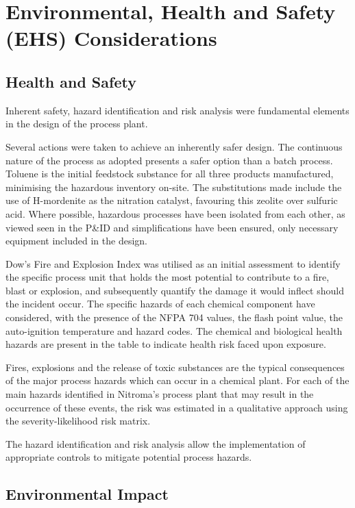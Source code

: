 \section{Environmental, Health and Safety (EHS) Considerations}
\label{sec:ehs}
\subsection{Health and Safety}

Inherent safety, hazard identification and risk analysis were fundamental elements in the design of the process plant. 

Several actions were taken to achieve an inherently safer design. The continuous nature of the process as adopted presents a safer option than a batch process. Toluene is the initial feedstock substance for all three products manufactured, minimising the hazardous inventory on-site. The substitutions made include the use of H-mordenite as the nitration catalyst, favouring this zeolite over sulfuric acid. Where possible, hazardous processes have been isolated from each other, as viewed seen in the P&ID and simplifications have been ensured, only necessary equipment included in the design. 

Dow's Fire and Explosion Index was utilised as an initial assessment to identify the specific process unit that holds the most potential to contribute to a fire, blast or explosion, and subsequently quantify the damage it would inflect should the incident occur. The specific hazards of each chemical component have considered, with the presence of the NFPA 704 values, the flash point value, the auto-ignition temperature and hazard codes. The chemical and biological health hazards are present in the table to indicate health risk faced upon exposure.  

Fires, explosions and the release of toxic substances are the typical consequences of the major process hazards which can occur in a chemical plant. For each of the main hazards identified in Nitroma's process plant that may result in the occurrence of these events, the risk was estimated in a qualitative approach using the severity-likelihood risk matrix. 

The hazard identification and risk analysis allow the implementation of appropriate controls to mitigate potential process hazards. 


\subsection{Environmental Impact}

